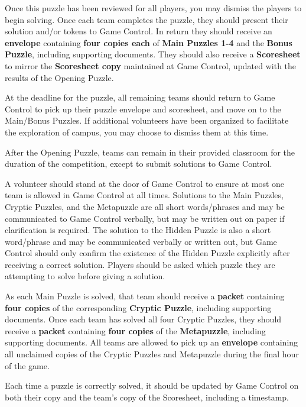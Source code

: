 Once this puzzle has been reviewed for all players, you may dismiss the players
to begin solving. Once each team completes the puzzle, they should present
their solution and/or tokens to Game Control. In return they should receive
an \textbf{envelope} containing \textbf{four copies each} of
\textbf{Main Puzzles 1-4} and the \textbf{Bonus Puzzle}, including supporting
documents. They should also
receive a \textbf{Scoresheet} to mirror the \textbf{Scoresheet copy} maintained
at Game Control, updated with the results of the Opening Puzzle.

At the deadline for the puzzle, all remaining teams should return to
Game Control to pick up their puzzle envelope and scoresheet, and move
on to the Main/Bonus Puzzles. If additional
volunteers have been organized to facilitate the exploration of campus,
you may choose to dismiss them at this time.


After the Opening Puzzle,
teams can remain in their provided classroom for the duration of the
competition, except to submit solutions to Game Control.

A volunteer should stand at the door of Game Control to ensure at most
one team is allowed in Game Control at all times. Solutions to the
Main Puzzles, Cryptic Puzzles, and the Metapuzzle are all short words/phrases
and may be communicated to Game Control verbally, but may be written out
on paper if clarification is required. The solution to the Hidden Puzzle
is also a short word/phrase and may be communicated verbally or written out,
but Game Control should only confirm the existence of the Hidden Puzzle
explicitly after receiving a correct solution. Players should be asked
which puzzle they are attempting to solve before giving a solution.

As each Main Puzzle is solved, that team should receive a \textbf{packet}
containing \textbf{four copies} of the corresponding \textbf{Cryptic Puzzle},
including supporting documents.
Once each team has solved all four Cryptic Puzzles, they should receive a
\textbf{packet} containing \textbf{four copies} of the \textbf{Metapuzzle},
including supporting documents.
All teams are allowed to pick up an \textbf{envelope} containing all
unclaimed copies of the Cryptic Puzzles and Metapuzzle during the final hour
of the game.

Each time a puzzle is correctly solved, it should be updated by Game Control
on both their copy and the team's copy of the Scoresheet, including a
timestamp.

